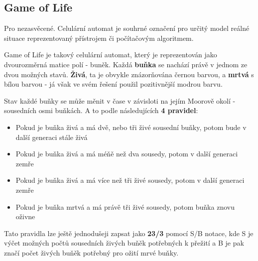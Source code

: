 \documentclass[11pt,a4paper,titlepage]{article}
\begin{document}
\subsection{Game of Life}

Pro nezasvěcené. Celulární automat je souhrné označení pro určitý model reálné situace reprezentovaný přístrojem či počítačovým algoritmem.

Game of Life je takový celulární automat, který je reprezentován jako dvourozměrná matice polí - buněk. Každá {\bf buňka} se nachází právě v jednom ze dvou možných stavů. {\bf Živá}, ta je obvykle znázorňována černou barvou, a {\bf mrtvá} s bílou barvou - já však ve svém řešení použil pozitivnější modrou barvu.

Stav každé buňky se může měnit v čase v závisloti na jejím Moorově okolí - sousedních osmi buňkách. A to podle následujících {\bf 4 pravidel}:
\begin{itemize}
  \item Pokud je buňka živá a má dvě, nebo tři živé sousední buňky, potom bude v další generaci stále živá 
  \item Pokud je buňka živá a má méňě než dva sousedy, potom v další generaci zemře 
  \item Pokud je buňka živá a má více než tři živé sousedy, potom v další generaci zemře 
  \item Pokud je buňka mrtvá a má právě tři živé sousedy, potom buňka znovu oživne
\end{itemize}
Tato pravidla lze ještě jednodušeji zapsat jako {\bf 23/3} pomocí S/B notace, kde S je výčet možných počtů sousedních živých buňěk potřebných k přežití a B je pak značí počet živých buňěk potřebný pro ožití mrvé buňky.
\end{document}
